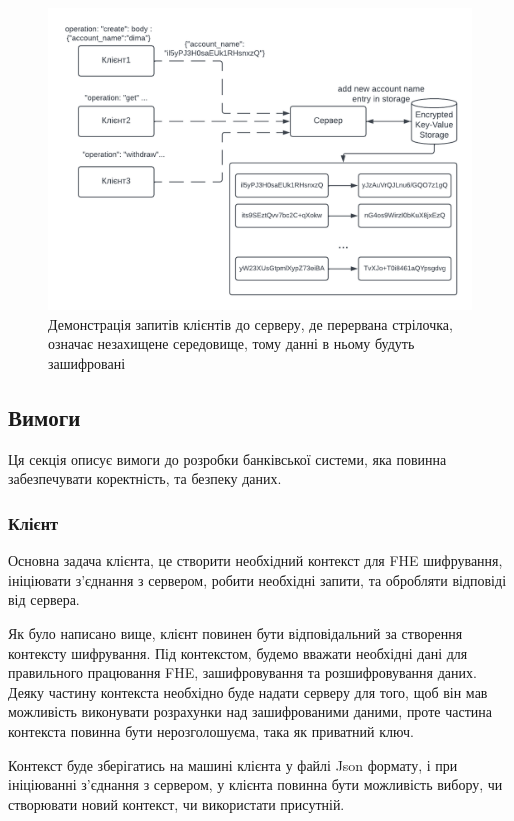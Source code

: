 \begin{figure}[!ht]
    \centering
    \includegraphics{static/client-server-logic.png}
    \caption{Демонстрація запитів клієнтів до серверу, де перервана стрілочка, означає
    незахищене середовище, тому данні в ньому будуть зашифровані}
    \label{fig:client-server-logic}
\end{figure}

\subsection{Вимоги}
Ця секція описує вимоги до розробки банківської системи, яка повинна забезпечувати коректність,
та безпеку даних.
\subsubsection*{Клієнт}
Основна задача клієнта, це створити необхідний контекст для FHE шифрування, ініціювати
з'єднання з сервером, робити необхідні запити, та обробляти відповіді від сервера.

Як було написано вище, клієнт повинен бути відповідальний за створення контексту шифрування. Під
контекстом, будемо вважати необхідні дані для правильного працювання FHE, зашифровування та розшифровування даних.
Деяку частину контекста необхідно буде надати серверу для того, щоб він мав можливість виконувати
розрахунки над зашифрованими даними, проте частина контекста повинна бути нерозголошуєма, така як
приватний ключ.

Контекст буде зберігатись на машині клієнта у файлі Json формату, і при ініціюванні з'єднання
з сервером, у клієнта повинна бути можливість вибору, чи створювати новий контекст, чи використати
присутній.

